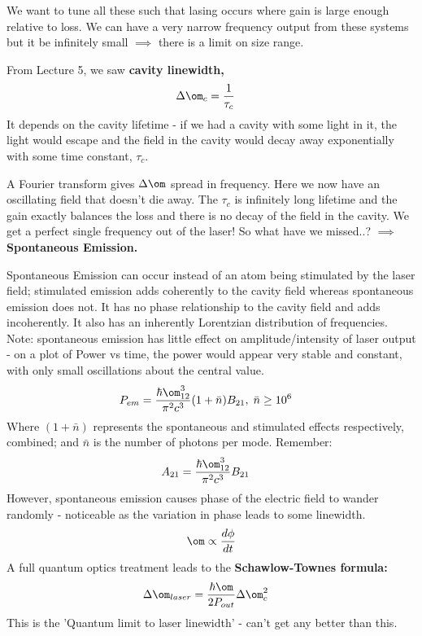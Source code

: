 \documentclass[a4paper, 11pt, normalem]{report}
\begin{document}
We want to tune all these such that lasing occurs where gain is large enough relative to loss.
We can have a very narrow frequency output from these systems but it  be infinitely small $\implies$ there is a limit on size range.

From Lecture 5, we saw \textbf{cavity linewidth,}
\begin{align}
    \Delta\om_c &= \frac{1}{\tau_c}
\end{align}
It depends on the cavity lifetime - if we had a cavity with some light in it, the light would escape and the field in the cavity would decay away exponentially with some time constant, $\tau_c$.
\begin{figure}[H]
    \centering
\end{figure}
A Fourier transform gives $\Delta\om$ spread in frequency.
Here we now have an oscillating field that doesn't die away.
The $\tau_c$ is infinitely long lifetime and the gain exactly balances the loss and there is no decay of the field in the cavity.
We get a perfect single frequency out of the laser!
So what have we missed..? $\implies$ \textbf{Spontaneous Emission.}

Spontaneous Emission can occur instead of an atom being stimulated by the laser field; stimulated emission adds coherently to the cavity field whereas spontaneous emission does not.
It has no phase relationship to the cavity field and adds incoherently.
It also has an inherently Lorentzian distribution of frequencies.
Note: spontaneous emission has little effect on amplitude/intensity of laser output - on a plot of Power vs time, the power would appear very stable and constant, with only small oscillations about the central value.
\begin{align}
    P_{em} &= \frac{\hbar\om_{12}^3}{\pi^2c^3}(1+\bar{n})B_{21},\; \bar{n} \geq 10^6
\end{align}
Where $(1+\bar{n})$ represents the spontaneous and stimulated effects respectively, combined; and $\bar{n}$ is the number of photons per mode.
Remember:
\begin{align}
    A_{21} &= \frac{\hbar\om_{12}^3}{\pi^2c^3}B_{21}
\end{align}
However, spontaneous emission causes phase of the electric field to wander randomly - noticeable as the variation in phase leads to some linewidth.
\begin{align}
    \om\propto\frac{d\phi}{dt}
\end{align}
A full quantum optics treatment leads to the \textbf{Schawlow-Townes formula:}
\begin{align}
    \Delta\om_{laser} &= \frac{\hbar\om}{2P_{out}}\Delta\om_c^2
\end{align}
This is the 'Quantum limit to laser linewidth' - can't get any better than this.
\end{document}
